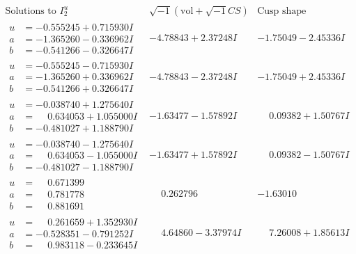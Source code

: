\documentclass[1p]{elsarticle_modified}
\theoremstyle{definition}
\newcommand{\I}{\sqrt{-1}}
\begin{document}
$$\begin{array}{c|c|c}  
\text{Solutions to }I^u_{2}& \I (\text{vol} + \sqrt{-1}CS) & \text{Cusp shape}\\
 \hline 
\begin{aligned}
u &= -0.555245 + 0.715930 I \\
a &= -1.365260 - 0.336962 I \\
b &= -0.541266 - 0.326647 I\end{aligned}
 & -4.78843 + 2.37248 I & -1.75049 - 2.45336 I \\ \hline\begin{aligned}
u &= -0.555245 - 0.715930 I \\
a &= -1.365260 + 0.336962 I \\
b &= -0.541266 + 0.326647 I\end{aligned}
 & -4.78843 - 2.37248 I & -1.75049 + 2.45336 I \\ \hline\begin{aligned}
u &= -0.038740 + 1.275640 I \\
a &= \phantom{-}0.634053 + 1.055000 I \\
b &= -0.481027 + 1.188790 I\end{aligned}
 & -1.63477 - 1.57892 I & \phantom{-}0.09382 + 1.50767 I \\ \hline\begin{aligned}
u &= -0.038740 - 1.275640 I \\
a &= \phantom{-}0.634053 - 1.055000 I \\
b &= -0.481027 - 1.188790 I\end{aligned}
 & -1.63477 + 1.57892 I & \phantom{-}0.09382 - 1.50767 I \\ \hline\begin{aligned}
u &= \phantom{-}0.671399\phantom{ +0.000000I} \\
a &= \phantom{-}0.781778\phantom{ +0.000000I} \\
b &= \phantom{-}0.881691\phantom{ +0.000000I}\end{aligned}
 & \phantom{-}0.262796\phantom{ +0.000000I} & -1.63010\phantom{ +0.000000I} \\ \hline\begin{aligned}
u &= \phantom{-}0.261659 + 1.352930 I \\
a &= -0.528351 - 0.791252 I \\
b &= \phantom{-}0.983118 - 0.233645 I\end{aligned}
 & \phantom{-}4.64860 - 3.37974 I & \phantom{-}7.26008 + 1.85613 I \\ \hline\begin{aligned}

\end{aligned}
\end{array}$$
\end{document}
